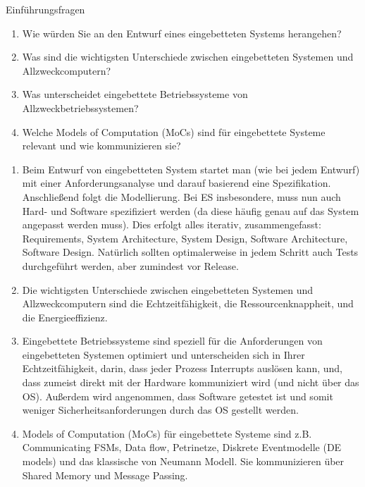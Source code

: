 \documentclass{article}
\author{Leopold Lemmermann}
\begin{document}
\createtitle

\begin{exercise}{Einführungsfragen}
  \begin{enumerate}
    \item Wie würden Sie an den Entwurf eines eingebetteten Systems herangehen?
    \item Was sind die wichtigsten Unterschiede zwischen eingebetteten Systemen und Allzweckcomputern?
    \item Was unterscheidet eingebettete Betriebssysteme von Allzweckbetriebssystemen?
    \item Welche Models of Computation (MoCs) sind für eingebettete Systeme relevant und wie kommunizieren sie?
  \end{enumerate}

  \begin{solution}
    \begin{enumerate}
      \item Beim Entwurf von eingebetteten System startet man (wie bei jedem Entwurf) mit einer Anforderungsanalyse und darauf basierend eine Spezifikation. Anschließend folgt die Modellierung. Bei ES insbesondere, muss nun auch Hard- und Software spezifiziert werden (da diese häufig genau auf das System angepasst werden muss). Dies erfolgt alles iterativ, zusammengefasst: Requirements, System Architecture, System Design, Software Architecture, Software Design. Natürlich sollten optimalerweise in jedem Schritt auch Tests durchgeführt werden, aber zumindest vor Release.
      \item Die wichtigsten Unterschiede zwischen eingebetteten Systemen und Allzweckcomputern sind die Echtzeitfähigkeit, die Ressourcenknappheit, und die Energieeffizienz.
      \item Eingebettete Betriebssysteme sind speziell für die Anforderungen von eingebetteten Systemen optimiert und unterscheiden sich in Ihrer Echtzeitfähigkeit, darin, dass jeder Prozess Interrupts auslösen kann, und, dass zumeist direkt mit der Hardware kommuniziert wird (und nicht über das OS). Außerdem wird angenommen, dass Software getestet ist und somit weniger Sicherheitsanforderungen durch das OS gestellt werden.
      \item Models of Computation (MoCs) für eingebettete Systeme sind z.B. Communicating FSMs, Data flow, Petrinetze, Diskrete Eventmodelle (DE models) und das klassische von Neumann Modell. Sie kommunizieren über Shared Memory und Message Passing.
    \end{enumerate}
  \end{solution}
\end{exercise}
\end{document}
